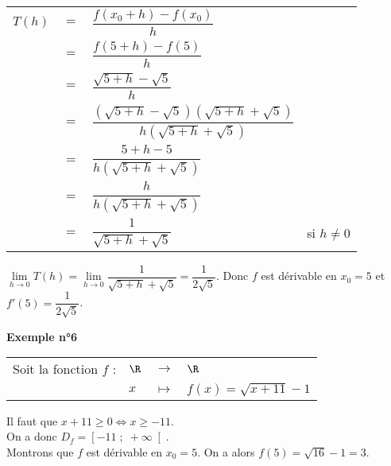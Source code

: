 \begin{tabular}{llll}
$T(h)$ & $=$ & $\dfrac{f(x_0 + h) - f(x_0)}{h}$ & \vspace*{.3cm} \\
& $=$ & $\dfrac{f(5 + h) - f(5)}{h}$ & \vspace*{.3cm} \\
& $=$ & $\dfrac{\sqrt{5 + h} - \sqrt{5}}{h}$ & \vspace*{.3cm} \\
& $=$ & $\dfrac{\left(\sqrt{5 + h} - \sqrt{5}\right)\left(\sqrt{5 + h} + \sqrt{5}\right)}{h\left(\sqrt{5 + h} + \sqrt{5}\right)}$ & \vspace*{.3cm} \\
& $=$ & $\dfrac{5 + h - 5}{h\left(\sqrt{5 + h} + \sqrt{5}\right)}$ & \vspace*{.3cm} \\
& $=$ & $\dfrac{h}{h\left(\sqrt{5 + h} + \sqrt{5}\right)}$ & \vspace*{.3cm} \\
& $=$ & $\dfrac{1}{\sqrt{5 + h} + \sqrt{5}}$ & si $h\neq 0$ \vspace*{.3cm} \\
\end{tabular}

\vspace*{.3cm}

$\lim\limits_{h \to 0} T(h) = \lim\limits_{h \to 0} \dfrac{1}{\sqrt{5 + h} + \sqrt{5}} = \dfrac{1}{2\sqrt{5}}$. Donc $f$ est dérivable en $x_0 = 5$ et $f'(5) = \dfrac{1}{2\sqrt{5}}$. \\

\newpage

\textbf{Exemple n°6} \\

\begin{tabular}{llll}
Soit la fonction $f$ : & $\R$ & $\longrightarrow$ & $\R$ \\
& $x$ & $\longmapsto$ & $f\left(x\right) = \sqrt{x + 11} - 1$ \\
\end{tabular}

Il faut que $x + 11 \geqslant 0 \Longleftrightarrow x \geqslant - 11$. \\

On a donc $D_f = \left[-11 \; ; \; +\infty \right[$. \\

Montrons que $f$ est dérivable en $x_0 = 5$. On a alors $f(5) = \sqrt{16} - 1 = 3$. \\

